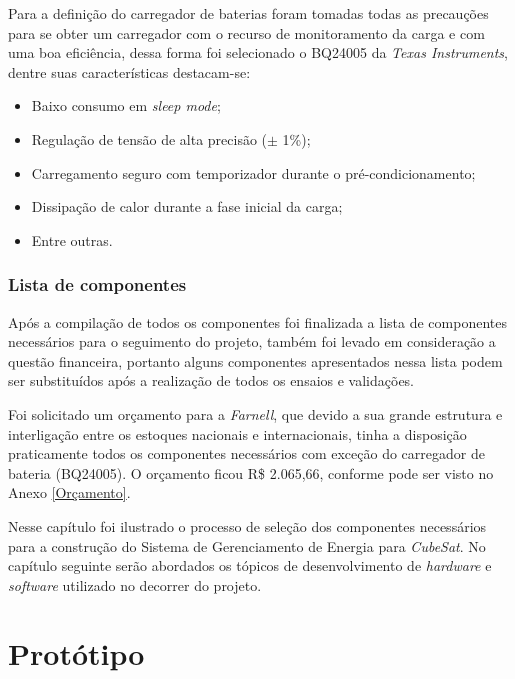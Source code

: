 \documentclass[
	12pt,				%
	openright,			%
	oneside,			%
	a4paper,			%
	english,			%
	french,				%
	spanish,			%
	brazil,				%
	oldfontcommands
	]{abntex2}
\begin{document}
	Para a definição do carregador de baterias foram tomadas todas as precauções para se obter um carregador com o recurso de monitoramento da carga e com uma boa eficiência, dessa forma foi selecionado o BQ24005 da \textit{Texas Instruments}, dentre suas características destacam-se:
	
	\begin{itemize}
		\item Baixo consumo em \textit{sleep mode};
		\item Regulação de tensão de alta precisão ($\pm$ 1\%);
		\item Carregamento seguro com temporizador durante o pré-condicionamento;
		\item Dissipação de calor durante a fase inicial da carga;
		\item Entre outras.
	\end{itemize}
	
\subsection[Lista de componentes]{Lista de componentes}

	Após a compilação de todos os componentes foi finalizada a lista de componentes necessários para o seguimento do projeto, também foi levado em consideração a questão financeira, portanto alguns componentes apresentados nessa lista podem ser substituídos após a realização de todos os ensaios e validações.
		
	Foi solicitado um orçamento para a \textit{Farnell}, que devido a sua grande estrutura e interligação entre os estoques nacionais e internacionais, tinha a disposição praticamente todos os componentes necessários com exceção do carregador de bateria (BQ24005). O orçamento ficou R\$ 2.065,66, conforme pode ser visto no Anexo \ref{Orçamento}.	
	
	Nesse capítulo foi ilustrado o processo de seleção dos componentes necessários para a construção do Sistema de Gerenciamento de Energia para \textit{CubeSat}. No capítulo seguinte serão abordados os tópicos de desenvolvimento de \textit{hardware} e \textit{software} utilizado no decorrer do projeto.
	
\chapter[Protótipo]{Protótipo}
\end{document}
